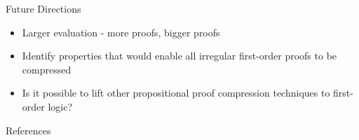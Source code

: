 \documentclass[final]{beamer} %
\begin{document}
\begin{frame}{}
\begin{columns}
\begin{column}{0.3\textwidth}
    
          \begin{block}{Future Directions}
    \begin{itemize}
    \item Larger evaluation - more proofs, bigger proofs
    \item Identify properties that would enable all irregular first-order proofs to be compressed
    \item Is it possible to lift other propositional proof compression techniques to first-order logic?
    \end{itemize}
    	\end{block}
    
      \begin{block}{References}


    \end{block}    
        \vfill
  \end{column}
\end{columns}


    
  \end{frame}
\end{document}
